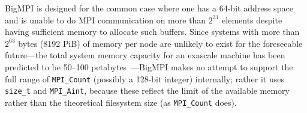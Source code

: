 BigMPI is designed for the common case where one has a 64-bit address
space and is unable to do MPI communication on more than $2^{31}$ elements
despite having sufficient memory to allocate such buffers.
Since systems with more than $2^{63}$ bytes (8192 PiB) of memory 
per node are unlikely to exist for the foreseeable future---the
 total system memory capacity for an exascale machine has been 
predicted to be 50--100 petabytes~\cite{shalf2011exascale}---BigMPI
makes no attempt to support the full range of \texttt{MPI\_Count}
(possibly a 128-bit integer) internally; rather it uses \texttt{size\_t}
and \texttt{MPI\_Aint}, because these reflect the limit of the available memory
rather than the theoretical filesystem size (as \texttt{MPI\_Count} does).
